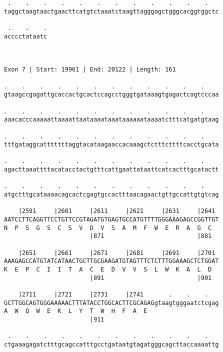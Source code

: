 \documentclass{article}
\begin{document}
\begin{Verbatim}
 .    .    .    .    .    .    .    .    .    .    .    .   
taggctaagtaactgaacttcatgtctaaatctaagttagggagctgggcacggtggctc
                                                            
 .    .    .
acccctataatc
            
            
 
Exon 7 | Start: 19961 | End: 20122 | Length: 161
 
.    .    .    .    .    .    .    .    .    .    .    .    
gtaagccgagattgcaccactgcactccagcctgggtgataaagtgagactcagtcccaa
                                                            
.    .    .    .    .    .    .    .    .    .    .    .    
aaacacccaaaaattaaaattaataaaataaataaaaaataaaatctttcatgatgtaag
                                                            
.    .    .    .    .    .    .    .    .    .    .    .    
tttgataggcatttttttaggtacataagaaccacaaagctctttcttttcacctgcata
                                                            
.    .    .    .    .    .    .    .    .    .    .    .    
agacttaaattttacatacctactgtttcattgaattataattcatcactttgcatactt
                                                            
.    .    .    .    .    .    .    .    .    .    .    .    
atgctttgcataaaacagcactcgagtgccactttaacagaactgttgccattgtgtcag
                                                            
    |2591     |2601     |2611     |2621     |2631     |2641 
AATCCTTCAGGTTCCTGTTCCGTAGATGTGAGTGCCATGTTTTGGGAAAGAGCCGGTTGT
N  P  S  G  S  C  S  V  D  V  S  A  M  F  W  E  R  A  G  C  
                        |871                          |881  
  
    |2651     |2661     |2671     |2681     |2691     |2701 
AAAGAGCCATGTATCATAACTGCTTGCGAAGATGTAGTTTCTCTTTGGAAAGCTCTGGAT
K  E  P  C  I  I  T  A  C  E  D  V  V  S  L  W  K  A  L  D  
                        |891                          |901  
  
    |2711     |2721     |2731     |2741       .    .    .   
GCTTGGCAGTGGGAAAAACTTTATACCTGGCACTTCGCAGAGgtaagtgggaatctcgag
A  W  Q  W  E  K  L  Y  T  W  H  F  A  E                    
                        |911                                
  
 .    .    .    .    .    .    .    .    .    .    .    .   
ctgaaagagatctttgcagccatttgcctgataatgtagatgggcagcttaccaaaattg
                                                            

\end{Verbatim}
\end{document}
